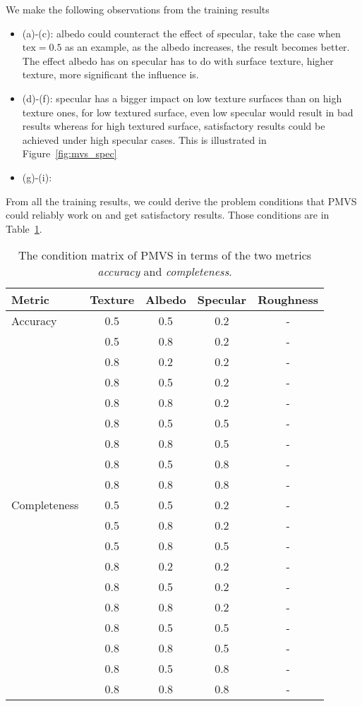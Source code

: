 We make the following observations from the training results
\begin{itemize}
\item (a)-(c): albedo could counteract the effect of specular, take the case when $\text{tex}=0.5$ as an example, as the albedo increases, the result becomes better. The effect albedo has on specular has to do with surface texture, \ie higher texture, more significant the influence is.
\item (d)-(f): specular has a bigger impact on low texture surfaces than on high texture ones, \ie for low textured surface, even low specular would result in bad results whereas for high textured surface, satisfactory results could be achieved under high specular cases. This is illustrated in Figure~\ref{fig:mvs_spec}
\item (g)-(i): 
\end{itemize}

From all the training results, we could derive the problem conditions that PMVS could reliably work on and get satisfactory results. Those conditions are in Table~\ref{tab:mvs_traing_result}.
\begin{table}[!htbp]
  \centering
  \begin{tabular}{l*{4}{c}}
  \hline
  \textbf{Metric} & Texture & Albedo & Specular & Roughness\\
  \hline
  Accuracy & 0.5 & 0.5 & 0.2 & -\\
           & 0.5 & 0.8 & 0.2 & -\\
           & 0.8 & 0.2 & 0.2 & -\\
           & 0.8 & 0.5 & 0.2 & -\\
           & 0.8 & 0.8 & 0.2 & -\\
           & 0.8 & 0.5 & 0.5 & -\\
           & 0.8 & 0.8 & 0.5 & -\\
           & 0.8 & 0.5 & 0.8 & -\\
           & 0.8 & 0.8 & 0.8 & -\\
  \hline
  Completeness & 0.5 & 0.5 & 0.2 & -\\
               & 0.5 & 0.8 & 0.2 & -\\
               & 0.5 & 0.8 & 0.5 & -\\
               & 0.8 & 0.2 & 0.2 & -\\
               & 0.8 & 0.5 & 0.2 & -\\
               & 0.8 & 0.8 & 0.2 & -\\
               & 0.8 & 0.5 & 0.5 & -\\
               & 0.8 & 0.8 & 0.5 & -\\
               & 0.8 & 0.5 & 0.8 & -\\
               & 0.8 & 0.8 & 0.8 & -\\
  \hline
  \end{tabular}
  \caption{The condition matrix of PMVS in terms of the two metrics \textit{accuracy} and \textit{completeness}.}
  \label{tab:mvs_traing_result}
\end{table}

